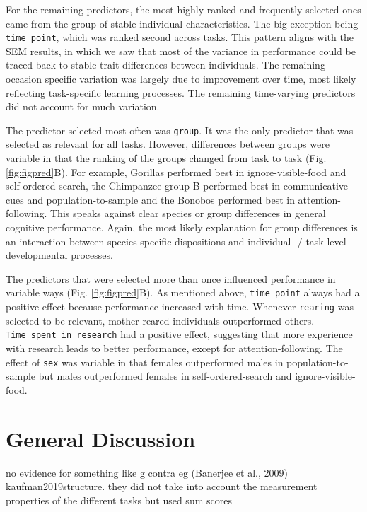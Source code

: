 \documentclass[
  man,floatsintext]{apa6}
\begin{document}
For the remaining predictors, the most highly-ranked and frequently selected ones came from the group of stable individual characteristics. The big exception being \texttt{time\ point}, which was ranked second across tasks. This pattern aligns with the SEM results, in which we saw that most of the variance in performance could be traced back to stable trait differences between individuals. The remaining occasion specific variation was largely due to improvement over time, most likely reflecting task-specific learning processes. The remaining time-varying predictors did not account for much variation.

The predictor selected most often was \texttt{group}. It was the only predictor that was selected as relevant for all tasks. However, differences between groups were variable in that the ranking of the groups changed from task to task (Fig. \ref{fig:figpred}B). For example, Gorillas performed best in ignore-visible-food and self-ordered-search, the Chimpanzee group B performed best in communicative-cues and population-to-sample and the Bonobos performed best in attention-following. This speaks against clear species or group differences in general cognitive performance. Again, the most likely explanation for group differences is an interaction between species specific dispositions and individual- / task-level developmental processes.

The predictors that were selected more than once influenced performance in variable ways (Fig. \ref{fig:figpred}B). As mentioned above, \texttt{time\ point} always had a positive effect because performance increased with time. Whenever \texttt{rearing} was selected to be relevant, mother-reared individuals outperformed others. \texttt{Time\ spent\ in\ research} had a positive effect, suggesting that more experience with research leads to better performance, except for attention-following. The effect of \texttt{sex} was variable in that females outperformed males in population-to-sample but males outperformed females in self-ordered-search and ignore-visible-food.

\hypertarget{general-discussion}{%
\section{General Discussion}\label{general-discussion}}

no evidence for something like g contra eg (Banerjee et al., 2009) kaufman2019structure. they did not take into account the measurement properties of the different tasks but used sum scores
\end{document}
